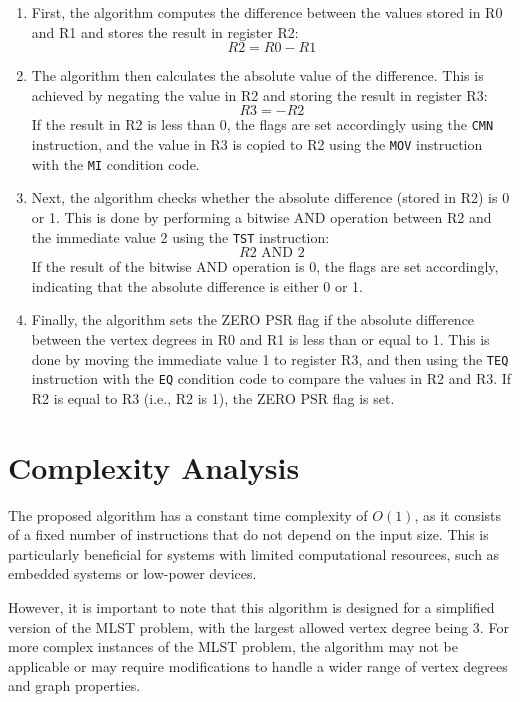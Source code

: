 \begin{enumerate}
    \item First, the algorithm computes the difference between the values stored in R0 and R1 and stores the result in register R2:
    \begin{equation}
        R2 = R0 - R1
    \end{equation}
    \item The algorithm then calculates the absolute value of the difference. This is achieved by negating the value in R2 and storing the result in register R3:
    \begin{equation}
        R3 = -R2
    \end{equation}
    If the result in R2 is less than 0, the flags are set accordingly using the \texttt{CMN} instruction, and the value in R3 is copied to R2 using the \texttt{MOV} instruction with the \texttt{MI} condition code.
    \item Next, the algorithm checks whether the absolute difference (stored in R2) is 0 or 1. This is done by performing a bitwise AND operation between R2 and the immediate value 2 using the \texttt{TST} instruction:
    \begin{equation}
        R2 \text{ AND } 2
    \end{equation}
    If the result of the bitwise AND operation is 0, the flags are set accordingly, indicating that the absolute difference is either 0 or 1.
    \item Finally, the algorithm sets the ZERO PSR flag if the absolute difference between the vertex degrees in R0 and R1 is less than or equal to 1. This is done by moving the immediate value 1 to register R3, and then using the \texttt{TEQ} instruction with the \texttt{EQ} condition code to compare the values in R2 and R3. If R2 is equal to R3 (i.e., R2 is 1), the ZERO PSR flag is set.
\end{enumerate}

\section{Complexity Analysis}
The proposed algorithm has a constant time complexity of $O(1)$, as it consists of a fixed number of instructions that do not depend on the input size. This is particularly beneficial for systems with limited computational resources, such as embedded systems or low-power devices.

However, it is important to note that this algorithm is designed for a simplified version of the MLST problem, with the largest allowed vertex degree being 3. For more complex instances of the MLST problem, the algorithm may not be applicable or may require modifications to handle a wider range of vertex degrees and graph properties.

